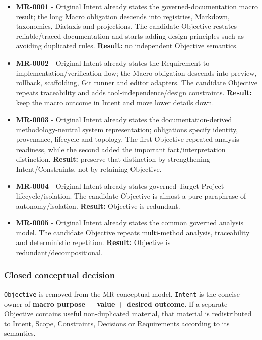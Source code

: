 \documentclass[
  10pt,
]{article}
\providecommand{\tightlist}{%
  \setlength{\itemsep}{0pt}\setlength{\parskip}{0pt}}
\begin{document}
\begin{itemize}
\tightlist
\item
  \textbf{MR-0001} - Original Intent already states the
  governed-documentation macro result; the long Macro obligation
  descends into registries, Markdown, taxonomies, Diataxis and
  projections. The candidate Objective restates reliable/traced
  documentation and starts adding design principles such as avoiding
  duplicated rules. \textbf{Result:} no independent Objective semantics.
\item
  \textbf{MR-0002} - Original Intent already states the
  Requirement-to-implementation/verification flow; the Macro obligation
  descends into preview, rollback, scaffolding, Git runner and editor
  adapters. The candidate Objective repeats traceability and adds
  tool-independence/design constraints. \textbf{Result:} keep the macro
  outcome in Intent and move lower details down.
\item
  \textbf{MR-0003} - Original Intent already states the
  documentation-derived methodology-neutral system representation;
  obligations specify identity, provenance, lifecycle and topology. The
  first Objective repeated analysis-readiness, while the second added
  the important fact/interpretation distinction. \textbf{Result:}
  preserve that distinction by strengthening Intent/Constraints, not by
  retaining Objective.
\item
  \textbf{MR-0004} - Original Intent already states governed Target
  Project lifecycle/isolation. The candidate Objective is almost a pure
  paraphrase of autonomy/isolation. \textbf{Result:} Objective is
  redundant.
\item
  \textbf{MR-0005} - Original Intent already states the common governed
  analysis model. The candidate Objective repeats multi-method analysis,
  traceability and deterministic repetition. \textbf{Result:} Objective
  is redundant/decompositional.
\end{itemize}

\subsubsection{Closed conceptual
decision}\label{closed-conceptual-decision}

\texttt{Objective} is removed from the MR conceptual model.
\texttt{Intent} is the concise owner of \textbf{macro purpose + value +
desired outcome}. If a separate Objective contains useful non-duplicated
material, that material is redistributed to Intent, Scope, Constraints,
Decisions or Requirements according to its semantics.
\end{document}

